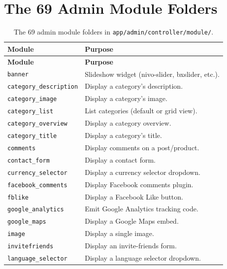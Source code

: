\documentclass[11pt,a4paper]{article}
\begin{document}
\appendix

\section{The 69 Admin Module Folders}\label{app:modules}

\begin{longtable}{p{5.5cm}p{7.0cm}}
\caption{The 69 admin module folders in \texttt{app/admin/controller/module/}.}\label{tab:modules-full}\\
\toprule
\textbf{Module} & \textbf{Purpose} \\
\midrule
\endfirsthead
\toprule
\textbf{Module} & \textbf{Purpose} \\
\midrule
\endhead
\bottomrule
\endfoot
\texttt{banner}                  & Slideshow widget (nivo-slider, bxslider, etc.). \\
\texttt{category\_description}   & Display a category's description. \\
\texttt{category\_image}         & Display a category's image. \\
\texttt{category\_list}          & List categories (default or grid view). \\
\texttt{category\_overview}      & Display a category overview. \\
\texttt{category\_title}         & Display a category's title. \\
\texttt{comments}                & Display comments on a post/product. \\
\texttt{contact\_form}           & Display a contact form. \\
\texttt{currency\_selector}      & Display a currency selector dropdown. \\
\texttt{facebook\_comments}      & Display Facebook comments plugin. \\
\texttt{fblike}                  & Display a Facebook Like button. \\
\texttt{google\_analytics}       & Emit Google Analytics tracking code. \\
\texttt{google\_maps}            & Display a Google Maps embed. \\
\texttt{image}                   & Display a single image. \\
\texttt{invitefriends}           & Display an invite-friends form. \\
\texttt{language\_selector}      & Display a language selector dropdown. \\

\end{longtable}
\end{document}
